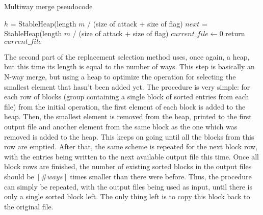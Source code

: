 \documentclass[10pt,a4paper]{article}
\begin{document}
\begin{algorithm}[H]
    \caption{Multiway merge pseudocode}


    \BlankLine
    $h$ = StableHeap(length $m$ / (size of attack + size of flag)\;
    $next$ = StableHeap(length $m$ / (size of attack + size of flag)\;
    $current\_file \leftarrow 0$\;
    return $current\_file$\;
\end{algorithm}

The second part of the replacement selection method uses, once again, a heap, but this time its length is equal to the number of ways. This step is basically an N-way merge, but using a heap to optimize the operation for selecting the smallest element that hasn't been added yet. The procedure is very simple: for each row of blocks (group containing a single block of sorted entries from each file) from the initial operation, the first element of each block is added to the heap. Then, the smallest element is removed from the heap, printed to the first output file and another element from the same block as the one which was removed is added to the heap. This keeps on going until all the blocks from this row are emptied. After that, the same scheme is repeated for the next block row, with the entries being written to the next available output file this time. Once all block rows are finished, the number of existing sorted blocks in the output files should be $\left \lceil{\#ways}\right \rceil$ times smaller than there were before. Thus, the procedure can simply be repeated, with the output files being used as input, until there is only a single sorted block left. The only thing left is to copy this block back to the original file.
\end{document}
